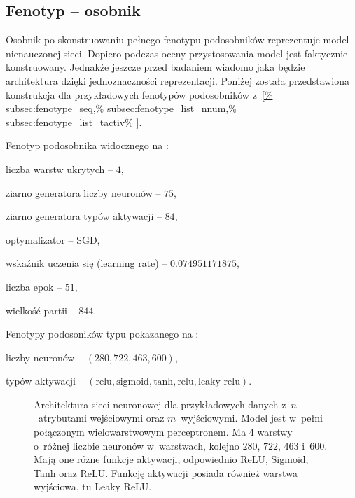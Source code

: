 \subsection{Fenotyp -- osobnik}
\label{subsec:fenotype_ind}
Osobnik po skonstruowaniu pełnego fenotypu
podosobników reprezentuje model nienauczonej sieci.
Dopiero podczas oceny przystosowania
model jest faktycznie konstruowany.
Jednakże jeszcze przed badaniem wiadomo jaka będzie
architektura dzięki jednoznaczności reprezentacji.
Poniżej została przedstawiona konstrukcja
dla przykładowych fenotypów podosobników
z~\cref{%
  subsec:fenotype_seq,%
  subsec:fenotype_list_nnum,%
  subsec:fenotype_list_tactiv%
}.

Fenotyp podosobnika widocznego na
:
\begin{nospitemize}
  \item liczba warstw ukrytych -- $4$,
  \item ziarno generatora liczby neuronów -- $75$,
  \item ziarno generatora typów aktywacji -- $84$,
  \item optymalizator -- SGD,
  \item wskaźnik uczenia się (learning rate)
    -- $0.074951171875$,
  \item liczba epok -- $51$,
  \item wielkość partii -- $844$.
\end{nospitemize}

Fenotypy podosoników typu pokazanego na
:
\begin{nospitemize}
  \item liczby neuronów
    -- $\left(280, 722, 463, 600\right)$,
  \item typów aktywacji -- $\left(
    \text{relu},
    \text{sigmoid},
    \text{tanh},
    \text{relu},
    \text{leaky relu}
  \right)$.
\end{nospitemize}

\begin{figure}
  \centering 
  \caption{
    Architektura sieci neuronowej
    dla przykładowych danych
    z~$n$~atrybutami wejściowymi
    oraz $m$~wyjściowymi.
    Model jest w~pełni połączonym
    wielowarstwowym perceptronem.
    Ma 4 warstwy o~różnej
    liczbie neuronów w~warstwach,
    kolejno $280$, $722$, $463$ i~$600$.
    Mają one różne funkcje aktywacji,
    odpowiednio ReLU, Sigmoid, Tanh oraz ReLU.
    Funkcję aktywacji posiada również
    warstwa wyjściowa, tu Leaky ReLU.
  }
  \label{fig:ind_fenotype}
\end{figure}

